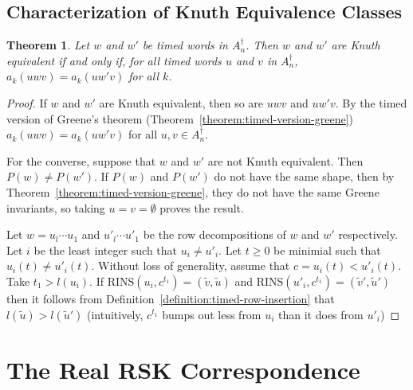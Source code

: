 \documentclass[10pt]{amsproc}
\newtheorem{theorem}{Theorem}[subsection]
\theoremstyle{definition}
\theoremstyle{remark}
\newcommand{\rowins}{\mathrm{RINS}}
\begin{document}
\subsection{Characterization of Knuth Equivalence Classes}
\label{sec:char-timed-knuth}
\begin{theorem}
  Let $w$ and $w'$ be timed words in $A_n^\dagger$.
  Then $w$ and $w'$ are Knuth equivalent if and only if, for all timed words $u$ and $v$ in $A_n^\dagger$, $a_k(uwv)=a_k(uw'v)$ for all $k$.
\end{theorem}
\begin{proof}
  If $w$ and $w'$ are Knuth equivalent, then so are $uwv$ and $uw'v$.
  By the timed version of Greene's theorem (Theorem~\ref{theorem:timed-version-greene}) $a_k(uwv)=a_k(uw'v)$ for all $u,v\in A_n^\dagger$.

  For the converse, suppose that $w$ and $w'$ are not Knuth equivalent.
  Then $P(w)\neq P(w')$.
  If $P(w)$ and $P(w')$ do not have the same shape, then by Theorem~\ref{theorem:timed-version-greene}, they do not have the same Greene invariants, so taking $u=v=\emptyset$ proves the result.

  Let $w=u_l\dotsb u_1$ and $u'_l\dotsb u'_1$ be the row decompositions of $w$ and $w'$ respectively.
  Let $i$ be the least integer such that $u_i\neq u'_i$.
  Let $t\geq 0$ be minimial such that $u_i(t)\neq u'_i(t)$.
  Without loss of generality, assume that $c=u_i(t)<u'_i(t)$.
  Take $t_1>l(u_i)$.
  If $\rowins(u_i,c^{t_1}) = (\tilde v,\tilde u)$ and $\rowins(u'_i,c^{t_1}) = (\tilde v',\tilde u')$ then it follows from Definition~\ref{definition:timed-row-insertion} that $l(\tilde u)>l(\tilde u')$ (intuitively, $c^{t_1}$ bumps out less from $u_i$ than it does from $u'_i$)
\end{proof}
\section{The Real RSK Correspondence}
\label{sec:rsk}
\end{document}
